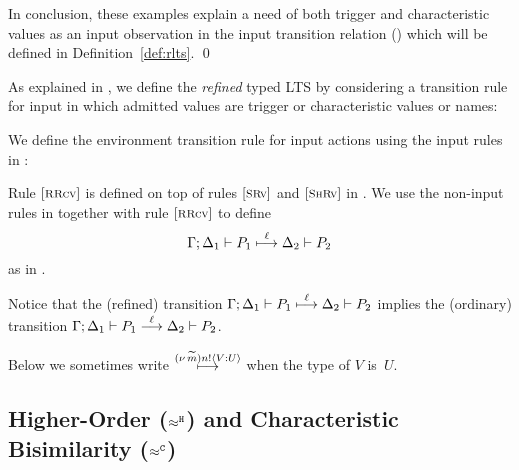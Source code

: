 \begin{example}
	In conclusion, these examples explain a need of both 
	trigger and characteristic values 
	as an input observation in the input transition relation ()
	which will be defined in Definition~\ref{def:rlts}.
	\qed
\end{example}

\noi As explained in , 
we define the
\emph{refined} typed LTS
by considering a transition rule for input in which admitted values are
trigger or characteristic values or names:


\begin{definition}
	\label{def:rlts}
	We define the environment transition rule for input actions 
	using the input rules in :
	\begin{mathpar}
	\end{mathpar}
	\noi Rule $\eltsrule{RRcv}$ is defined on top
	of rules $\eltsrule{SRv}$ and $\eltsrule{ShRv}$
	in .
	We  use the non-input rules in 
	together with rule $\eltsrule{RRcv}$
	to define 
	$$\horel{\Gamma}{\Delta_1}{P_1}{\hby{\ell}}{\Delta_2}{P_2}$$
	as in .
\end{definition}
 Notice that
the (refined) transition
$\horel{\Gamma}{\Delta_1}{P_1}{\hby{\ell}}{\Delta_2}{P_2}$  implies  
the (ordinary) transition
$\horel{\Gamma}{\Delta_1}{P_1}{\by{\,\ell\,}}{\Delta_2}{P_2}$.
\begin{notation} 
Below we sometimes write  
$\hby{\news{\widetilde{m}} \bactout{n}{\AT{V}{U}}}$
when the type of $V$ is~$U$.
\end{notation}


\subsection{Higher-Order ($\hwb$) and  Characteristic  Bisimilarity ($\fwb$)}
\label{ss:hwb}

